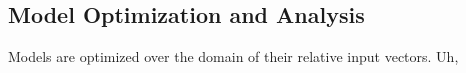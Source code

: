 \subsection{Model Optimization and Analysis}

Models are optimized over the domain of their relative input vectors. Uh, 

\subsubsection{}